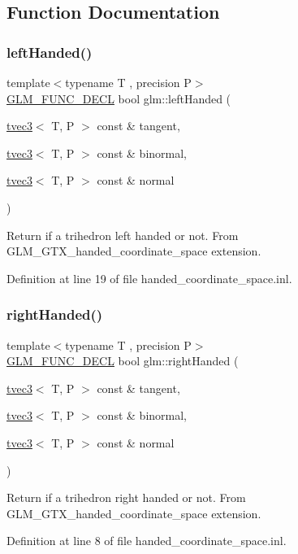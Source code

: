 \subsection{Function Documentation}
\mbox{\label{group__gtx__handed__coordinate__space_ga7425e0ebfe6a56919900a072ae1f8017}} 
\subsubsection{\texorpdfstring{leftHanded()}{leftHanded()}}
{\footnotesize\ttfamily template$<$typename T , precision P$>$ \\
\mbox{\hyperlink{setup_8hpp_ab2d052de21a70539923e9bcbf6e83a51}{G\+L\+M\+\_\+\+F\+U\+N\+C\+\_\+\+D\+E\+CL}} bool glm\+::left\+Handed (\begin{DoxyParamCaption}\item[{\mbox{\hyperlink{structglm_1_1tvec3}{tvec3}}$<$ T, P $>$ const \&}]{tangent,  }\item[{\mbox{\hyperlink{structglm_1_1tvec3}{tvec3}}$<$ T, P $>$ const \&}]{binormal,  }\item[{\mbox{\hyperlink{structglm_1_1tvec3}{tvec3}}$<$ T, P $>$ const \&}]{normal }\end{DoxyParamCaption})}

Return if a trihedron left handed or not. From G\+L\+M\+\_\+\+G\+T\+X\+\_\+handed\+\_\+coordinate\+\_\+space extension. 

Definition at line 19 of file handed\+\_\+coordinate\+\_\+space.\+inl.

\mbox{\label{group__gtx__handed__coordinate__space_ga17cd83888de8755c0435c589fafd3603}} 
\subsubsection{\texorpdfstring{rightHanded()}{rightHanded()}}
{\footnotesize\ttfamily template$<$typename T , precision P$>$ \\
\mbox{\hyperlink{setup_8hpp_ab2d052de21a70539923e9bcbf6e83a51}{G\+L\+M\+\_\+\+F\+U\+N\+C\+\_\+\+D\+E\+CL}} bool glm\+::right\+Handed (\begin{DoxyParamCaption}\item[{\mbox{\hyperlink{structglm_1_1tvec3}{tvec3}}$<$ T, P $>$ const \&}]{tangent,  }\item[{\mbox{\hyperlink{structglm_1_1tvec3}{tvec3}}$<$ T, P $>$ const \&}]{binormal,  }\item[{\mbox{\hyperlink{structglm_1_1tvec3}{tvec3}}$<$ T, P $>$ const \&}]{normal }\end{DoxyParamCaption})}

Return if a trihedron right handed or not. From G\+L\+M\+\_\+\+G\+T\+X\+\_\+handed\+\_\+coordinate\+\_\+space extension. 

Definition at line 8 of file handed\+\_\+coordinate\+\_\+space.\+inl.

